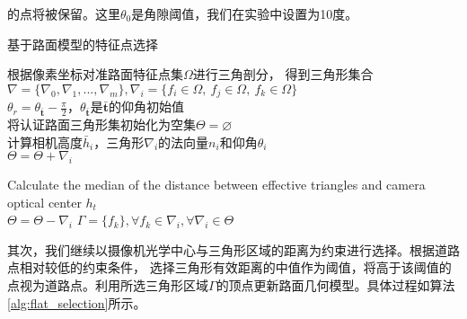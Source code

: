的点将被保留。这里$\theta_0$是角隙阈值，我们在实验中设置为10度。
\begin{algorithm}
    \caption{基于路面模型的特征点选择}
    根据像素坐标对准路面特征点集$\Omega$进行三角剖分， 得到三角形集合$\nabla=\{\nabla_0,\nabla_1,...,\nabla_m\},\nabla_{i}=\{ f_i \in \Omega,\ f_j \in \Omega,\ f_k \in \Omega\}$\\
        {$\theta_r=\theta_\mathbf{\bar{t}}-\frac{\pi}{2}$，$\theta_\mathbf{\bar{t}}$是$\mathbf{\bar{t}}$的仰角初始值\\}
        将认证路面三角形集初始化为空集$\Theta =\varnothing$\\
     {   
        计算相机高度$\bar{h}_i$，三角形$\nabla_i$的法向量$n_i$和仰角$\theta_i$\\
         {
             $\Theta =\Theta + {\nabla_i}$
         }
     }
         
         Calculate the median of the distance between effective triangles and camera optical center $h_t$\\
     {   
         {
             $\Theta =\Theta - {\nabla_i}$
         }
     }
     $\Gamma =\{f_k\}, \forall f_k\in \nabla_i, \forall\nabla_i\in\Theta$
\label{alg:flat_selection}
\end{algorithm}

其次，我们继续以摄像机光学中心与三角形区域的距离为约束进行选择。根据道路点相对较低的约束条件，
选择三角形有效距离的中值作为阈值，将高于该阈值的点视为道路点。利用所选三角形区域$\Gamma$的顶点更新路面几何模型。具体过程如算法\ref{alg:flat_selection}所示。

